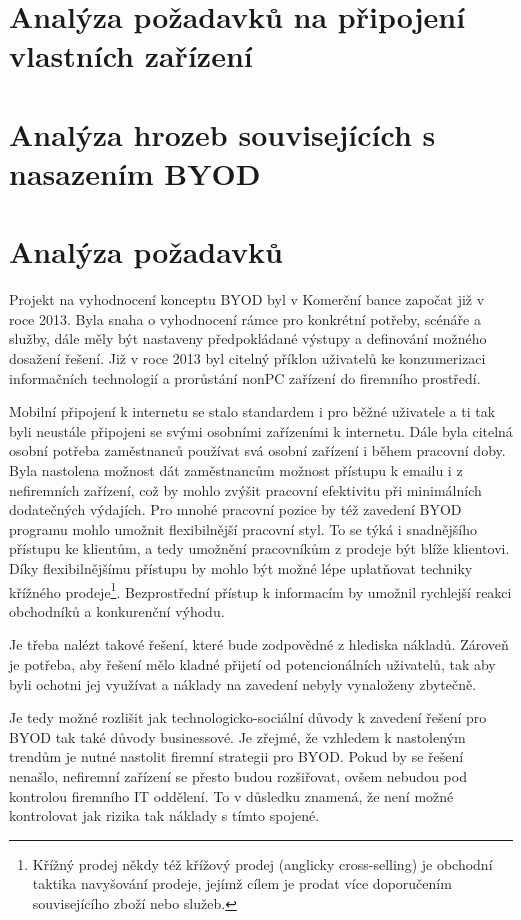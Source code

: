 \section{Analýza požadavků na připojení vlastních zařízení} 

\section{Analýza hrozeb souvisejících s nasazením BYOD}

\section{Analýza požadavků}
Projekt na vyhodnocení konceptu BYOD byl v Komerční bance započat již v roce 2013. Byla snaha o vyhodnocení rámce pro konkrétní potřeby, scénáře a služby, dále měly být nastaveny předpokládané výstupy a definování možného dosažení řešení. Již v roce 2013 byl citelný příklon uživatelů ke konzumerizaci informačních technologií a prorůstání nonPC zařízení do firemního prostředí.

Mobilní připojení k internetu se stalo standardem i pro běžné uživatele a ti tak byli neustále připojeni se svými osobními zařízeními k internetu. Dále byla citelná osobní potřeba zaměstnanců používat svá osobní zařízení i během pracovní doby. Byla nastolena možnost dát zaměstnancům možnost přístupu k emailu i z nefiremních zařízení, což by mohlo zvýšit pracovní efektivitu při minimálních dodatečných výdajích. Pro mnohé pracovní pozice by též zavedení BYOD programu mohlo umožnit flexibilnější pracovní styl. To se týká i snadnějšího přístupu ke klientům, a tedy umožnění pracovníkům z prodeje být blíže klientovi. Díky flexibilnějšímu přístupu by mohlo být možné lépe uplatňovat techniky křížného prodeje\footnote{Křížný prodej někdy též křížový prodej (anglicky cross-selling) je obchodní taktika navyšování prodeje, jejímž cílem je prodat více doporučením souvisejícího zboží nebo služeb.}. Bezprostřední přístup k informacím by umožnil rychlejší reakci obchodníků a konkurenční výhodu. 

Je třeba nalézt takové řešení, které bude zodpovědné z hlediska nákladů. Zároveň je potřeba, aby řešení mělo kladné přijetí od potencionálních uživatelů, tak aby byli ochotni jej využívat a náklady na zavedení nebyly vynaloženy zbytečně.  

Je tedy možné rozlišit jak technologicko-sociální důvody k zavedení řešení pro BYOD tak také důvody businessové. Je zřejmé, že vzhledem k nastoleným trendům je nutné nastolit firemní strategii pro BYOD. Pokud by se řešení nenašlo, nefiremní zařízení se přesto budou rozšiřovat, ovšem nebudou pod kontrolou firemního IT oddělení. To v důsledku znamená, že není možné kontrolovat jak rizika tak náklady s tímto spojené. 


